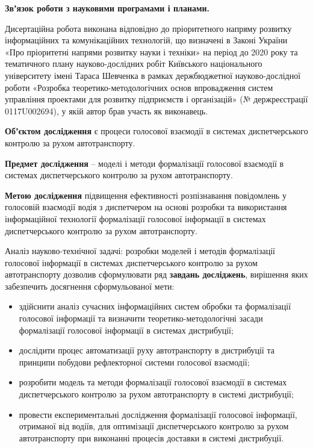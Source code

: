\textbf{Звʼязок роботи з науковими програмами і планами.}

Дисертаційна робота виконана відповідно до пріоритетного напряму розвитку інформаційних та комунікаційних технологій, що визначені в Законі України «Про пріоритетні напрями розвитку науки і техніки» на період до 2020 року та тематичного плану науково-дослідних робіт Київського національного університету імені Тараса Шевченка в рамках держбюджетної науково-дослідної роботи «Розробка теоретико-методологічних основ впровадження систем управління проектами для розвитку підприємств і організацій» (№ держреєстрації 0117U002694), у якій автор брав участь як виконавець.

\textbf{Обʼєктом дослідження} є процеси голосової взаємодії в системах диспетчерського контролю за рухом автотранспорту.

\textbf{Предмет дослідження} – моделі і методи формалізації голосової взаємодії в системах диспетчерського контролю за рухом автотранспорту.

\textbf{Метою дослідження} підвищення ефективності розпізнавання повідомлень у голосовій взаємодії водія з диспетчером на основі розробки та використання інформаційної технології формалізації голосової інформації в системах диспетчерського контролю за рухом автотранспорту.

Аналіз науково-технічної задачі: розробки моделей і методів формалізації голосової інформації в системах диспетчерського контролю за рухом автотранспорту дозволив сформулювати ряд \textbf{завдань досліджень}, вирішення яких забезпечить досягнення сформульованої мети:

\begin{itemize}
	\item здійснити аналіз сучасних інформаційних систем обробки та формалізації голосової інформації та визначити теоретико-методологічні засади формалізації голосової інформації в системах дистрибуції;
	\item дослідити процес автоматизації руху автотранспорту в дистрибуції та принципи побудови рефлекторної системи голосової взаємодії;
	\item розробити модель та методи формалізації голосової взаємодії в системах диспетчерського контролю за рухом автотранспорту в системі дистрибуції;
	\item провести експериментальні дослідження формалізації голосової інформації, отриманої від водіїв, для оптимізації диспетчерського контролю за рухом автотранспорту при виконанні процесів доставки в системі дистрибуції.
\end{itemize}


